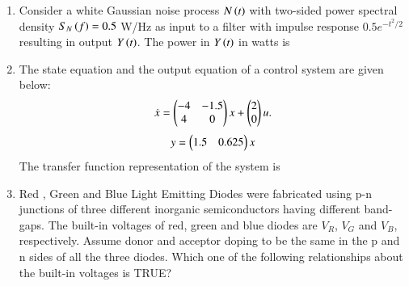 \documentclass[a4paper, 11pt]{article}
\begin{document}
\begin{enumerate}
    \hfill{}

    \item Consider a white Gaussian noise process $N\left(t\right)$ with two-sided power spectral density $S_N\left(f\right)=0.5$ W/Hz as input to a filter with impulse response $0.5e^{-t^2/2}$  resulting in output $Y\left(t\right)$. The power in $Y\left(t\right)$ in watts is
    \begin{enumerate}
    \end{enumerate}

    \hfill{}

    \item The state equation and the output equation of a control system are given below:
    \[ \dot{x} = \begin{pmatrix}-4 & -1.5 \\ 4 & 0\end{pmatrix} x + \begin{pmatrix}2 \\ 0\end{pmatrix} u. \]
    \[ y = \begin{pmatrix}1.5 & 0.625\end{pmatrix} x \]
    The transfer function representation of the system is
    \begin{enumerate}
    \end{enumerate}

    \hfill{}

    \item Red , Green  and Blue  Light Emitting Diodes  were fabricated using p-n junctions of three different inorganic semiconductors having different band-gaps. The built-in voltages of red, green and blue diodes are $V_R$, $V_G$ and $V_B$, respectively. Assume donor and acceptor doping to be the same  in the p and n sides of all the three diodes.
    Which one of the following relationships about the built-in voltages is TRUE?
    \begin{enumerate}
    \end{enumerate}


\end{enumerate}
\end{document}
